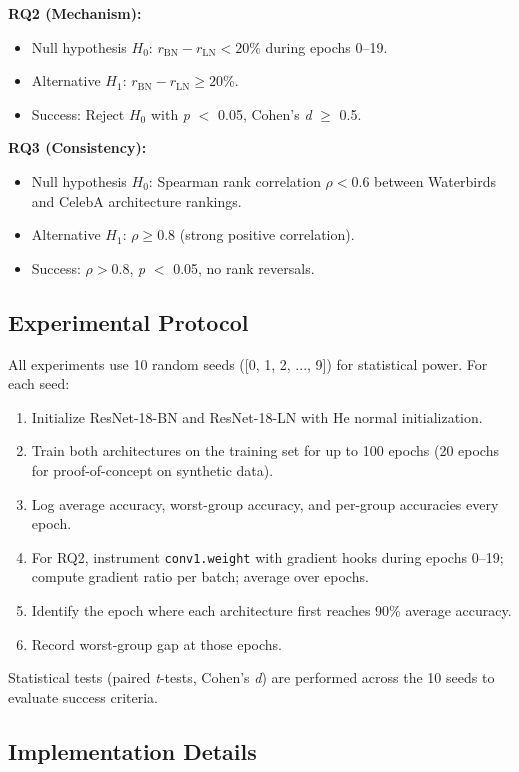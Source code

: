 \textbf{RQ2 (Mechanism):}
\begin{itemize}
\item Null hypothesis $H_0$: $r_{\text{BN}} - r_{\text{LN}} < 20\%$ during epochs 0--19.
\item Alternative $H_1$: $r_{\text{BN}} - r_{\text{LN}} \geq 20\%$.
\item Success: Reject $H_0$ with \emph{p} $<$ 0.05, Cohen's \emph{d} $\geq$ 0.5.
\end{itemize}

\textbf{RQ3 (Consistency):}
\begin{itemize}
\item Null hypothesis $H_0$: Spearman rank correlation $\rho < 0.6$ between Waterbirds and CelebA architecture rankings.
\item Alternative $H_1$: $\rho \geq 0.8$ (strong positive correlation).
\item Success: $\rho > 0.8$, \emph{p} $<$ 0.05, no rank reversals.
\end{itemize}

\subsection{Experimental Protocol}

All experiments use 10 random seeds ([0, 1, 2, ..., 9]) for statistical power. For each seed:

\begin{enumerate}
\item Initialize ResNet-18-BN and ResNet-18-LN with He normal initialization.
\item Train both architectures on the training set for up to 100 epochs (20 epochs for proof-of-concept on synthetic data).
\item Log average accuracy, worst-group accuracy, and per-group accuracies every epoch.
\item For RQ2, instrument \texttt{conv1.weight} with gradient hooks during epochs 0--19; compute gradient ratio per batch; average over epochs.
\item Identify the epoch where each architecture first reaches 90\% average accuracy.
\item Record worst-group gap at those epochs.
\end{enumerate}

Statistical tests (paired \emph{t}-tests, Cohen's \emph{d}) are performed across the 10 seeds to evaluate success criteria.

\subsection{Implementation Details}

